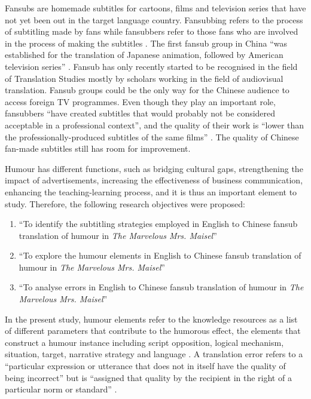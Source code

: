 \documentclass[english]{textolivre}
\begin{document}
Fansubs are homemade subtitles for cartoons, films and television series that have not yet been out in the target language country. Fansubbing refers to the process of subtitling made by fans while fansubbers refer to those fans who are involved in the process of making the subtitles \cite{diaz-cintas_subtitling:_2013}. The first fansub group in China “was established for the translation of Japanese animation, followed by American television series” \cite[p. 19]{gao_role_2018}. Fansub has only recently started to be recognised in the field of Translation Studies mostly by scholars working in the field of audiovisual translation. Fansub groups could be the only way for the Chinese audience to access foreign TV programmes. Even though they play an important role, fansubbers “have created subtitles that would probably not be considered acceptable in a professional context”, and the quality of their work is “lower than the professionally-produced subtitles of the same films” \cite[p. 101]{wilcock_comparative_2013}. The quality of Chinese fan-made subtitles still has room for improvement. 

Humour has different functions, such as bridging cultural gaps, strengthening the impact of advertisements, increasing the effectiveness of business communication, enhancing the teaching-learning process, and it is thus an important element to study. Therefore, the following research objectives were proposed: 

\begin{enumerate}
    \item “To identify the subtitling strategies employed in English to Chinese fansub translation of humour in \textit{The Marvelous Mrs. Maisel}”
    \item “To explore the humour elements in English to Chinese fansub translation of humour in \textit{The Marvelous Mrs. Maisel}”
    \item “To analyse errors in English to Chinese fansub translation of humour in \textit{The Marvelous Mrs. Maisel}”
\end{enumerate}

In the present study, humour elements refer to the knowledge resources as a list of different parameters that contribute to the humorous effect, the elements that construct a humour instance including script opposition, logical mechanism, situation, target, narrative strategy and language \cite{attardo_script_1991}. A translation error refers to a “particular expression or utterance that does not in itself have the quality of being incorrect” but is ``assigned that quality by the recipient in the right of a particular norm or standard'' \cite[p. 73]{nord_translation_2001}. 
\end{document}
